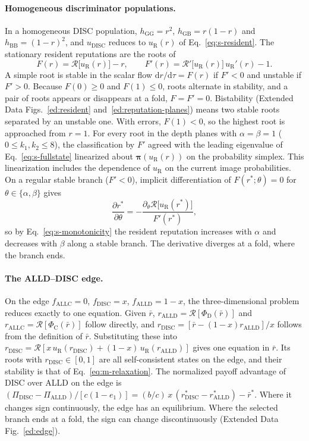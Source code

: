 \documentclass[fleqn,10pt]{wlscirep}
\newcommand{\Rmap}{\mathscr{R}}            %
\newcommand{\PhiC}{\Phi_{\mathrm{C}}}
\newcommand{\PhiD}{\Phi_{\mathrm{D}}}
\newcommand{\dd}{\mathrm{d}}
\newcommand{\ALLC}{\mathrm{ALLC}}
\newcommand{\ALLD}{\mathrm{ALLD}}
\newcommand{\DISC}{\mathrm{DISC}}
\theoremstyle{plain}
\begin{document}
\paragraph{Homogeneous discriminator populations.} In a homogeneous DISC population, $h_{\mathrm{GG}}=r^2$, $h_{\mathrm{GB}}=r(1-r)$ and $h_{\mathrm{BB}}=(1-r)^2$, and $u_{\DISC}$ reduces to $u_{\mathrm R}(r)$ of Eq.~\eqref{eq:s-resident}. The stationary resident reputations are the roots of
\begin{equation}
F(r)=\Rmap\bigl[u_{\mathrm R}(r)\bigr]-r,\qquad F'(r)=\Rmap'\bigl[u_{\mathrm R}(r)\bigr]\,u_{\mathrm R}'(r)-1.
\label{eq:s-F}
\end{equation}
A simple root is stable in the scalar flow $\dd r/\dd\tau=F(r)$ if $F'<0$ and unstable if $F'>0$. Because $F(0)\geq0$ and $F(1)\leq0$, roots alternate in stability, and a pair of roots appears or disappears at a fold, $F=F'=0$. Bistability (Extended Data Figs.~\ref{ed:resident} and~\ref{ed:reputation-planes}) means two stable roots separated by an unstable one. With errors, $F(1)<0$, so the highest root is approached from $r=1$. For every root in the depth planes with $\alpha=\beta=1$ ($0\leq k_1,k_2\leq8$), the classification by $F'$ agreed with the leading eigenvalue of Eq.~\eqref{eq:s-fullstate} linearized about $\bm\pi(u_{\mathrm R}(r))$ on the probability simplex. This linearization includes the dependence of $u_{\mathrm R}$ on the current image probabilities. On a regular stable branch ($F'<0$), implicit differentiation of $F(r^*;\theta)=0$ for $\theta\in\{\alpha,\beta\}$ gives
\begin{equation}
\frac{\partial r^*}{\partial\theta}=-\frac{\partial_\theta\Rmap\bigl[u_{\mathrm R}(r^*)\bigr]}{F'(r^*)},
\label{eq:s-sensitivity}
\end{equation}
so by Eq.~\eqref{eq:s-monotonicity} the resident reputation increases with $\alpha$ and decreases with $\beta$ along a stable branch. The derivative diverges at a fold, where the branch ends.

\paragraph{The ALLD--DISC edge.} On the edge $f_{\ALLC}=0$, $f_{\DISC}=x$, $f_{\ALLD}=1-x$, the three-dimensional problem reduces exactly to one equation. Given $\bar r$, $r_{\ALLD}=\Rmap[\PhiD(\bar r)]$ and $r_{\ALLC}=\Rmap[\PhiC(\bar r)]$ follow directly, and $r_{\DISC}=[\bar r-(1-x)r_{\ALLD}]/x$ follows from the definition of $\bar r$. Substituting these into $r_{\DISC}=\Rmap[x\,u_{\mathrm R}(r_{\DISC})+(1-x)\,u_{\mathrm R}(r_{\ALLD})]$ gives one equation in $\bar r$. Its roots with $r_{\DISC}\in[0,1]$ are all self-consistent states on the edge, and their stability is that of Eq.~\eqref{eq:m-relaxation}. The normalized payoff advantage of DISC over ALLD on the edge is $(\Pi_{\DISC}-\Pi_{\ALLD})/[c(1-e_1)]=(b/c)\,x\,(r^*_{\DISC}-r^*_{\ALLD})-\bar r^*$. Where it changes sign continuously, the edge has an equilibrium. Where the selected branch ends at a fold, the sign can change discontinuously (Extended Data Fig.~\ref{ed:edge}).
\end{document}
